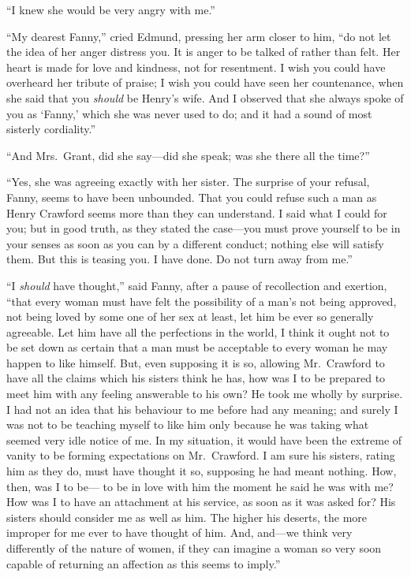 ``I knew she would be very angry with me.''

``My dearest Fanny,'' cried Edmund, pressing her arm closer
to him, ``do not let the idea of her anger distress you.
It is anger to be talked of rather than felt.  Her heart
is made for love and kindness, not for resentment.
I wish you could have overheard her tribute of praise;
I wish you could have seen her countenance, when she said
that you \emph{should} be Henry's wife.  And I observed that she
always spoke of you as `Fanny,' which she was never used to do;
and it had a sound of most sisterly cordiality.''

``And Mrs.\ Grant, did she say---did she speak; was she
there all the time?''

``Yes, she was agreeing exactly with her sister.  The surprise
of your refusal, Fanny, seems to have been unbounded.
That you could refuse such a man as Henry Crawford seems
more than they can understand.  I said what I could for you;
but in good truth, as they stated the case---you must
prove yourself to be in your senses as soon as you can
by a different conduct; nothing else will satisfy them.
But this is teasing you.  I have done.  Do not turn away
from me.''

``I \emph{should} have thought,'' said Fanny, after a pause
of recollection and exertion, ``that every woman must
have felt the possibility of a man's not being approved,
not being loved by some one of her sex at least, let him
be ever so generally agreeable.  Let him have all the
perfections in the world, I think it ought not to be set
down as certain that a man must be acceptable to every
woman he may happen to like himself.  But, even supposing
it is so, allowing Mr.\ Crawford to have all the claims
which his sisters think he has, how was I to be prepared
to meet him with any feeling answerable to his own?
He took me wholly by surprise.  I had not an idea that
his behaviour to me before had any meaning; and surely I
was not to be teaching myself to like him only because
he was taking what seemed very idle notice of me.
In my situation, it would have been the extreme of vanity
to be forming expectations on Mr.\ Crawford.  I am sure
his sisters, rating him as they do, must have thought it so,
supposing he had meant nothing.  How, then, was I to be---%
to be in love with him the moment he said he was with me?
How was I to have an attachment at his service, as soon
as it was asked for?  His sisters should consider me
as well as him.  The higher his deserts, the more improper
for me ever to have thought of him.  And, and---we think
very differently of the nature of women, if they can imagine
a woman so very soon capable of returning an affection
as this seems to imply.''

